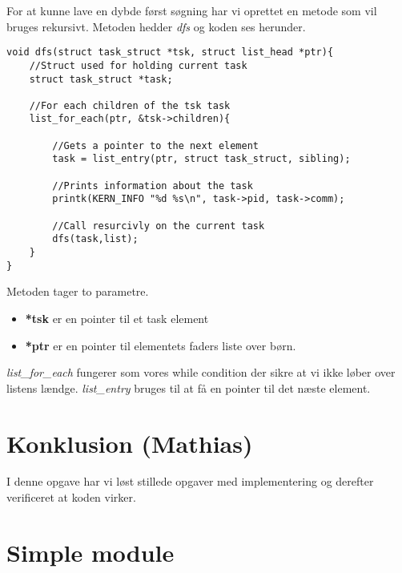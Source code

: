 \documentclass[danish]{report}
\begin{document}
For at kunne lave en dybde først søgning har vi oprettet en metode som vil bruges rekursivt. Metoden hedder \textit{dfs} og koden ses herunder.

\begin{lstlisting}
void dfs(struct task_struct *tsk, struct list_head *ptr){
	//Struct used for holding current task
	struct task_struct *task;
	
	//For each children of the tsk task
	list_for_each(ptr, &tsk->children){ 
	
		//Gets a pointer to the next element
		task = list_entry(ptr, struct task_struct, sibling); 
		
		//Prints information about the task
		printk(KERN_INFO "%d %s\n", task->pid, task->comm);
		
		//Call resurcivly on the current task
		dfs(task,list);
	}
}
\end{lstlisting}

Metoden tager to parametre.

\begin{itemize}
	\item \textbf{*tsk} er en pointer til et task element
	\item \textbf{*ptr} er en pointer til elementets faders liste over børn.
\end{itemize}

\textit{list\_for\_each} fungerer som vores while condition der sikre at vi ikke løber over listens lændge. \textit{list\_entry} bruges til at få en pointer til det næste element.


\chapter{Konklusion (Mathias)}
I denne opgave har vi løst stillede opgaver med implementering og derefter verificeret at koden virker.

\appendix
\chapter{Simple module}
\label{simple.c}
\end{document}
